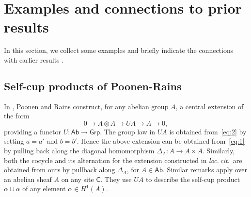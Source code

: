 \documentclass{amsart}
\numberwithin{equation}{subsection}
\theoremstyle{remark}
\theoremstyle{remark}
\newcommand{\loccit}{\textit{loc.\,cit.}\xspace}
\newcommand{\Ab}{\mathsf{Ab}} %
\newcommand{\C}{\mathsf{C}} %
\newcommand{\Grp}{\mathsf{Grp}} %
\begin{document}
\section{Examples and connections to prior results}
\label{sec:Examples}
In this section, we collect some examples and briefly indicate the connections with earlier results \cite{Bloch, Brylinski, Parshin, PoonenRains, Ramakrishnan}. 


\subsection{Self-cup products of Poonen-Rains}   In \cite{PoonenRains}, Poonen and Rains construct, for any abelian group $A$, a central extension of the form
  \begin{equation*}
    0 \to A\otimes A\to U\!A\to A \to 0,
  \end{equation*}
  providing a functor $U\colon \Ab\to \Grp$.  The group law in $U\!A$ is obtained from~\eqref{eq:2} by setting $a=a'$ and $b=b'$. Hence the above extension can be obtained from~\eqref{eq:1} by pulling back along the diagonal homomorphism $\Delta_A\colon A\to A\times A$. Similarly, both the cocycle and its alternation for the extension constructed in \loccit\ are obtained from ours by pullback along $\Delta_A$, for $A\in \Ab$. Similar remarks apply over an abelian sheaf $A$ on any site $\C$. They use  $U\!A$ to describe the self-cup product $\alpha \cup \alpha$ of any element $\alpha \in H^1(A)$. 
\end{document}
